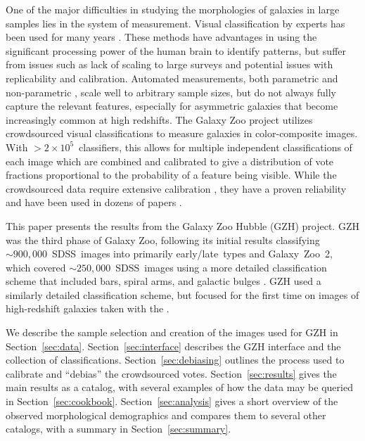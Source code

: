 \documentclass[twocolumn]{aastex6}
\begin{document}
One of the major difficulties in studying the morphologies of galaxies in large samples lies in the system of measurement. Visual classification by experts has been used for many years \citep[eg,][]{hub26,dev59,san61,van76,nai10,bai11,kar15}. These methods have advantages in using the significant processing power of the human brain to identify patterns, but suffer from issues such as lack of scaling to large surveys and potential issues with replicability and calibration. Automated measurements, both parametric \citep{pen02a,sim11,lac12} and non-parametric \citep{con03,lot04,sca07,bam08,fre13}, scale well to arbitrary sample sizes, but do not always fully capture the relevant features, especially for asymmetric galaxies that become increasingly common at high redshifts. The Galaxy Zoo project \citep{lin08,lin11} utilizes crowdsourced visual classifications to measure galaxies in color-composite images. With $>2\times10^5$~classifiers, this allows for multiple independent classifications of each image which are combined and calibrated to give a distribution of vote fractions proportional to the probability of a feature being visible. While the crowdsourced data require extensive calibration \citep{bam09,wil13}, they have a proven reliability and have been used in dozens of papers \citep[eg,][]{lan08,bam09,dar10,mas11c,ski12,sim13,sch14,wil15}. 

This paper presents the results from the Galaxy Zoo Hubble (GZH) project. GZH was the third phase of Galaxy Zoo, following its initial results classifying $\sim900,000$~SDSS~images into primarily early/late~types \citep{lin11} and Galaxy~Zoo~2, which covered $\sim250,000$~SDSS~images using a more detailed classification scheme that included bars, spiral arms, and galactic bulges \citep{wil13}. GZH used a similarly detailed classification scheme, but focused for the first time on images of high-redshift galaxies taken with the \hubble.

We describe the sample selection and creation of the images used for GZH in Section~\ref{sec:data}. Section~\ref{sec:interface} describes the GZH interface and the collection of classifications. Section~\ref{sec:debiasing} outlines the process used to calibrate and ``debias'' the crowdsourced votes. Section~\ref{sec:results} gives the main results as a catalog, with several examples of how the data may be queried in Section~\ref{sec:cookbook}. Section~\ref{sec:analysis} gives a short overview of the observed morphological demographics and compares them to several other catalogs, with a summary in Section~\ref{sec:summary}.
\end{document}
